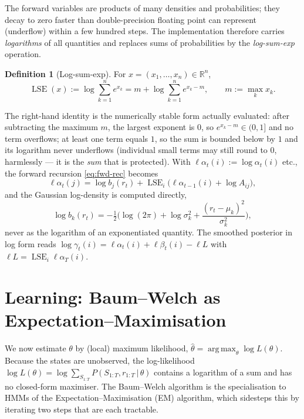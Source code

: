 \documentclass[11pt]{article}
\newcommand{\R}{\mathbb{R}}
\newcommand{\given}{\,\vert\,}
\newcommand{\eqdef}{:=}
\DeclareMathOperator*{\argmax}{arg\,max}
\newcommand{\state}{S}
\newcommand{\obs}{r}
\newcommand{\fwd}{\alpha}
\newcommand{\bwd}{\beta}
\theoremstyle{plain}
\theoremstyle{definition}
\newtheorem{definition}{Definition}
\theoremstyle{remark}
\begin{document}
The forward variables are products of many densities and probabilities; they
decay to zero faster than double-precision floating point can represent
(underflow) within a few hundred steps. The implementation therefore carries
\emph{logarithms} of all quantities and replaces sums of probabilities by the
\emph{log-sum-exp} operation.

\begin{definition}[Log-sum-exp]
For $x=(x_1,\dots,x_n)\in\R^n$,
\begin{equation}\label{eq:lse}
  \operatorname{LSE}(x) \eqdef \log\sum_{k=1}^n e^{x_k}
  = m + \log\sum_{k=1}^n e^{x_k-m},
  \qquad m \eqdef \max_k x_k .
\end{equation}
\end{definition}
The right-hand identity is the numerically stable form actually evaluated: after
subtracting the maximum $m$, the largest exponent is $0$, so $e^{x_k-m}\in(0,1]$
and no term overflows; at least one term equals $1$, so the sum is bounded below
by $1$ and its logarithm never underflows (individual small terms may still round
to $0$, harmlessly --- it is the \emph{sum} that is protected). With $\ell\fwd_t(i)\eqdef\log\fwd_t(i)$ etc., the forward
recursion \eqref{eq:fwd-rec} becomes
\begin{equation}
  \ell\fwd_t(j) = \log b_j(\obs_t)
  + \operatorname{LSE}_i\!\big(\ell\fwd_{t-1}(i)+\log A_{ij}\big),
\end{equation}
and the Gaussian log-density is computed directly,
\begin{equation}
  \log b_k(\obs_t) = -\tfrac12\Big(\log(2\pi)+\log\sigma_k^2
                     + \frac{(\obs_t-\mu_k)^2}{\sigma_k^2}\Big),
\end{equation}
never as the logarithm of an exponentiated quantity. The smoothed posterior in
log form reads $\log\gamma_t(i)=\ell\fwd_t(i)+\ell\bwd_t(i)-\ell L$ with
$\ell L=\operatorname{LSE}_i \ell\fwd_T(i)$.

\section{Learning: Baum--Welch as Expectation--Maximisation}\label{sec:em}

We now estimate $\theta$ by (local) maximum likelihood,
$\hat\theta=\argmax_\theta \log L(\theta)$. Because the states are unobserved,
the log-likelihood $\log L(\theta)=\log\sum_{\state_{1:T}} P(\state_{1:T},\obs_{1:T}\given\theta)$
contains a logarithm of a sum and has no closed-form maximiser. The
Baum--Welch algorithm is the specialisation to HMMs of the
Expectation--Maximisation (EM) algorithm, which sidesteps this by iterating two
steps that are each tractable.
\end{document}
